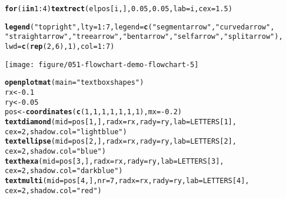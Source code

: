 \documentclass{article}\usepackage[]{graphicx}\usepackage[]{color}
\makeatletter
\def\maxwidth{ %
  \ifdim\Gin@nat@width>\linewidth
    \linewidth
  \else
    \Gin@nat@width
  \fi
}
\newcommand{\hlnum}[1]{\textcolor[rgb]{0.686,0.059,0.569}{#1}}%
\newcommand{\hlstr}[1]{\textcolor[rgb]{0.192,0.494,0.8}{#1}}%
\newcommand{\hlopt}[1]{\textcolor[rgb]{0,0,0}{#1}}%
\newcommand{\hlstd}[1]{\textcolor[rgb]{0.345,0.345,0.345}{#1}}%
\newcommand{\hlkwa}[1]{\textcolor[rgb]{0.161,0.373,0.58}{\textbf{#1}}}%
\newcommand{\hlkwb}[1]{\textcolor[rgb]{0.69,0.353,0.396}{#1}}%
\newcommand{\hlkwc}[1]{\textcolor[rgb]{0.333,0.667,0.333}{#1}}%
\newcommand{\hlkwd}[1]{\textcolor[rgb]{0.737,0.353,0.396}{\textbf{#1}}}%
\newenvironment{kframe}{%
 \def\at@end@of@kframe{}%
 \ifinner\ifhmode%
  \def\at@end@of@kframe{\end{minipage}}%
  \begin{minipage}{\columnwidth}%
 \fi\fi%
 \def\FrameCommand##1{\hskip\@totalleftmargin \hskip-\fboxsep
 \colorbox{shadecolor}{##1}\hskip-\fboxsep
     \hskip-\linewidth \hskip-\@totalleftmargin \hskip\columnwidth}%
 \MakeFramed {\advance\hsize-\width
   \@totalleftmargin\z@ \linewidth\hsize
   \@setminipage}}%
 {\par\unskip\endMakeFramed%
 \at@end@of@kframe}
\newenvironment{knitrout}{}{} %
\makeatother
\begin{document}
\begin{knitrout}
\begin{kframe}
\begin{alltt}
\hlkwa{for} \hlstd{(i} \hlkwa{in} \hlnum{1}\hlopt{:}\hlnum{4}\hlstd{)} \hlkwd{textrect}\hlstd{(elpos[i, ],} \hlnum{0.05}\hlstd{,} \hlnum{0.05}\hlstd{,} \hlkwc{lab} \hlstd{= i,} \hlkwc{cex} \hlstd{=} \hlnum{1.5}\hlstd{)}

\hlkwd{legend}\hlstd{(}\hlstr{"topright"}\hlstd{,} \hlkwc{lty} \hlstd{=} \hlnum{1}\hlopt{:}\hlnum{7}\hlstd{,} \hlkwc{legend} \hlstd{=} \hlkwd{c}\hlstd{(}\hlstr{"segmentarrow"}\hlstd{,} \hlstr{"curvedarrow"}\hlstd{,}
    \hlstr{"straightarrow"}\hlstd{,} \hlstr{"treearrow"}\hlstd{,} \hlstr{"bentarrow"}\hlstd{,} \hlstr{"selfarrow"}\hlstd{,} \hlstr{"splitarrow"}\hlstd{),}
    \hlkwc{lwd} \hlstd{=} \hlkwd{c}\hlstd{(}\hlkwd{rep}\hlstd{(}\hlnum{2}\hlstd{,} \hlnum{6}\hlstd{),} \hlnum{1}\hlstd{),} \hlkwc{col} \hlstd{=} \hlnum{1}\hlopt{:}\hlnum{7}\hlstd{)}
\end{alltt}
\end{kframe}
\texttt{[image: figure/051-flowchart-demo-flowchart-5]} 
\begin{kframe}\begin{alltt}
\hlkwd{openplotmat}\hlstd{(}\hlkwc{main} \hlstd{=} \hlstr{"textbox shapes"}\hlstd{)}
\hlstd{rx} \hlkwb{<-} \hlnum{0.1}
\hlstd{ry} \hlkwb{<-} \hlnum{0.05}
\hlstd{pos} \hlkwb{<-} \hlkwd{coordinates}\hlstd{(}\hlkwd{c}\hlstd{(}\hlnum{1}\hlstd{,} \hlnum{1}\hlstd{,} \hlnum{1}\hlstd{,} \hlnum{1}\hlstd{,} \hlnum{1}\hlstd{,} \hlnum{1}\hlstd{,} \hlnum{1}\hlstd{),} \hlkwc{mx} \hlstd{=} \hlopt{-}\hlnum{0.2}\hlstd{)}
\hlkwd{textdiamond}\hlstd{(}\hlkwc{mid} \hlstd{= pos[}\hlnum{1}\hlstd{, ],} \hlkwc{radx} \hlstd{= rx,} \hlkwc{rady} \hlstd{= ry,} \hlkwc{lab} \hlstd{= LETTERS[}\hlnum{1}\hlstd{],}
    \hlkwc{cex} \hlstd{=} \hlnum{2}\hlstd{,} \hlkwc{shadow.col} \hlstd{=} \hlstr{"lightblue"}\hlstd{)}
\hlkwd{textellipse}\hlstd{(}\hlkwc{mid} \hlstd{= pos[}\hlnum{2}\hlstd{, ],} \hlkwc{radx} \hlstd{= rx,} \hlkwc{rady} \hlstd{= ry,} \hlkwc{lab} \hlstd{= LETTERS[}\hlnum{2}\hlstd{],}
    \hlkwc{cex} \hlstd{=} \hlnum{2}\hlstd{,} \hlkwc{shadow.col} \hlstd{=} \hlstr{"blue"}\hlstd{)}
\hlkwd{texthexa}\hlstd{(}\hlkwc{mid} \hlstd{= pos[}\hlnum{3}\hlstd{, ],} \hlkwc{radx} \hlstd{= rx,} \hlkwc{rady} \hlstd{= ry,} \hlkwc{lab} \hlstd{= LETTERS[}\hlnum{3}\hlstd{],}
    \hlkwc{cex} \hlstd{=} \hlnum{2}\hlstd{,} \hlkwc{shadow.col} \hlstd{=} \hlstr{"darkblue"}\hlstd{)}
\hlkwd{textmulti}\hlstd{(}\hlkwc{mid} \hlstd{= pos[}\hlnum{4}\hlstd{, ],} \hlkwc{nr} \hlstd{=} \hlnum{7}\hlstd{,} \hlkwc{radx} \hlstd{= rx,} \hlkwc{rady} \hlstd{= ry,} \hlkwc{lab} \hlstd{= LETTERS[}\hlnum{4}\hlstd{],}
    \hlkwc{cex} \hlstd{=} \hlnum{2}\hlstd{,} \hlkwc{shadow.col} \hlstd{=} \hlstr{"red"}\hlstd{)}

\end{alltt}
\end{kframe}
\end{knitrout}
\end{document}
